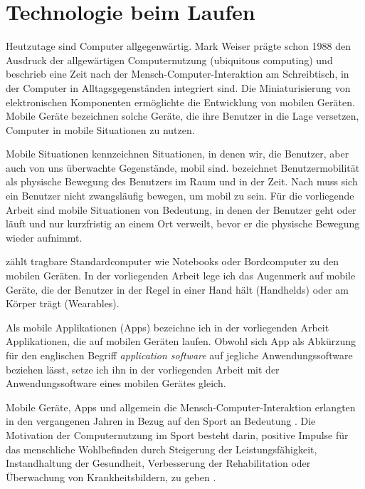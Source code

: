 

\chapter{Technologie beim Laufen} 

\label{cha:technologie_beim_laufen}

Heutzutage sind Computer allgegenwärtig. Mark Weiser prägte schon 1988 den Ausdruck der allgewärtigen Computernutzung (ubiquitous computing) und beschrieb eine Zeit nach der Mensch-Computer-Interaktion am Schreibtisch, in der Computer in Alltagsgegenständen integriert sind. Die Miniaturisierung von elektronischen Komponenten ermöglichte die Entwicklung von mobilen Geräten. Mobile Geräte bezeichnen solche Geräte, die ihre Benutzer in die Lage versetzen, Computer in mobile Situationen zu nutzen.

Mobile Situationen kennzeichnen Situationen, in denen wir, die Benutzer, aber auch von uns überwachte Gegenstände, mobil sind. \citet[][S.~24~ff.]{Cooper2002} bezeichnet Benutzermobilität als physische Bewegung des Benutzers im Raum und in der Zeit. Nach \citet[][S.~7]{Roth2005} muss sich ein Benutzer nicht zwangsläufig bewegen, um mobil zu sein. Für die vorliegende Arbeit sind mobile Situationen von Bedeutung, in denen der Benutzer geht oder läuft und nur kurzfristig an einem Ort verweilt, bevor er die physische Bewegung wieder aufnimmt.

\citet[][S.~5]{Roth2005} zählt tragbare Standardcomputer wie Notebooks oder Bordcomputer zu den mobilen Geräten. In der vorliegenden Arbeit lege ich das Augenmerk auf mobile Geräte, die der Benutzer in der Regel in einer Hand hält (Handhelds) oder am Körper trägt (Wearables).

Als mobile Applikationen (Apps) bezeichne ich in der vorliegenden Arbeit Applikationen, die auf mobilen Geräten laufen. Obwohl sich App als Abkürzung für den englischen Begriff \emph{application software} auf jegliche Anwendungssoftware beziehen lässt, setze ich ihn in der vorliegenden Arbeit mit der Anwendungssoftware eines mobilen Gerätes gleich.

Mobile Geräte, Apps und allgemein die Mensch-Computer-Interaktion erlangten in den vergangenen Jahren in Bezug auf den Sport an Bedeutung \citep[][]{Nylander2014}. Die Motivation der Computernutzung im Sport besteht darin, positive Impulse für das menschliche Wohlbefinden durch Steigerung der Leistungsfähigkeit, Instandhaltung der Gesundheit, Verbesserung der Rehabilitation oder Überwachung von Krankheitsbildern, zu geben \citep[][]{DigitalSportsGroupatthePatternRecognitionLab}.

